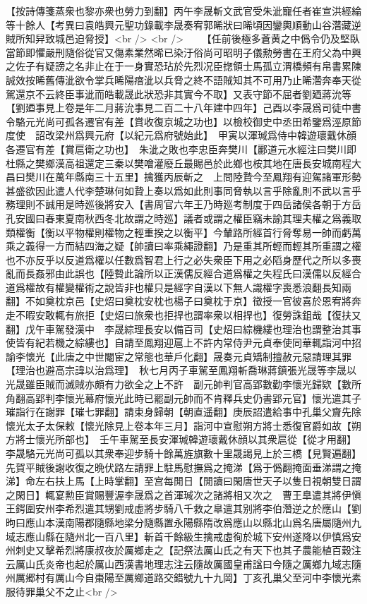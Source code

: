 【按詩傳箋蒸衆也黎亦衆也勞力到翻】丙午李晟斬文武官受朱泚寵任者崔宣洪經綸等十餘人【考異曰袁皓興元聖功錄載李晟奏宥郭晞狀曰晞頃因鑾輿順動山谷濳藏逆賊所知舁致城邑迫脅授】<br />
<br />
　　【任前後極多蒼黄之中僞令仍及堅臥當節即懼嚴刑隨俗從官又傷素業然晞已染汙俗尚可昭明子儀勲勞書在王府父為中興之佐子有疑謗之名非止在于一身實恐玷於先烈况臣揔領士馬孤立渭橋頻有帛書累陳誠效按晞舊傳泚欲令掌兵晞陽瘖泚以兵脅之終不語賊知其不可用乃止晞濳奔奉天從駕還京不云終臣事泚而皓載晟此狀恐非其實今不取】又表守節不屈者劉廼蔣沇等【劉廼事見上卷是年二月蔣沇事見二百二十八年建中四年】己酉以李晟爲司徒中書令駱元光尚可孤各遷官有差【賞收復京城之功也】以檢校御史中丞田希鑒爲涇原節度使　詔改梁州爲興元府【以紀元爲府號始此】　甲寅以渾瑊爲侍中韓遊瓌戴休顔各遷官有差【賞扈衛之功也】　朱泚之敗也李忠臣奔樊川【酈道元水經注曰樊川即杜縣之樊鄉漢高祖還定三秦以樊噲灌廢丘最賜邑於此鄉也桉其地在唐長安城南程大昌曰樊川在萬年縣南三十五里】擒獲丙辰斬之　上問陸贄今至鳳翔有迎駕諸軍形勢甚盛欲因此遣人代李楚琳何如贄上奏以爲如此則事同脅執以言乎除亂則不武以言乎務理則不誠用是時廵後將安入【書周官六年王乃時廵考制度于四岳諸侯各朝于方岳孔安國曰春東夏南秋西冬北故謂之時廵】議者或謂之權臣竊未諭其理夫權之爲義取類權衡【衡以平物權則權物之輕重揆之以衡平】今輦路所經首行脅奪易一帥而虧萬乘之義得一方而結四海之疑【帥讀曰率乘繩證翻】乃是重其所輕而輕其所重謂之權也不亦反乎以反道爲權以任數爲智君上行之必失衆臣下用之必䧟身歷代之所以多喪亂而長姦邪由此誤也【陸䞇此論所以正漢儒反經合道爲權之失程氏曰漢儒以反經合道爲權故有權變權術之說皆非也權只是經字自漢以下無人識權字喪悉浪翻長知兩翻】不如奠枕京邑【史炤曰奠枕安枕也楊子曰奠枕于京】徵授一官彼喜於恩宥將奔走不暇安敢輒有旅拒【史炤曰旅衆也拒捍也謂率衆以相捍也】復勞誅鉏哉【復扶又翻】戊午車駕發漢中　李晟綜理長安以備百司【史炤曰綜機縷也理治也謂整治其事使皆有紀若機之綜縷也】自請至鳳翔迎扈上不許内常侍尹元貞奉使同華輒詣河中招諭李懷光【此唐之中世閹宦之常態也華戶化翻】晟奏元貞矯制擅赦元惡請理其罪【理治也避高宗諱以治爲理】　秋七月丙子車駕至鳳翔斬喬琳蔣鎮張光晟等李晟以光晟雖臣賊而滅賊亦頗有力欲全之上不許　副元帥判官高郢數勸李懷光歸欵【數所角翻高郢判李懷光幕府懷光此時已罷副元帥而不肯釋兵史仍書郢元官】懷光遣其子璀詣行在謝罪【璀七罪翻】請束身歸朝【朝直遥翻】庚辰詔遣給事中孔巢父齎先除懷光太子太保敕【懷光除見上卷本年三月】詣河中宣慰朔方將士悉復官爵如故【朔方將士懷光所部也】　壬午車駕至長安渾瑊韓遊瓌戴休顔以其衆扈從【從才用翻】李晟駱元光尚可孤以其衆奉迎步騎十餘萬旌旗數十里晟謁見上於三橋【見賢遍翻】先賀平賊後謝收復之晩伏路左請罪上駐馬慰撫爲之掩涕【爲于僞翻掩面垂涕謂之掩涕】命左右扶上馬【上時掌翻】至宫每閒日【閒讀曰閑唐世天子以隻日視朝雙日謂之閑日】輒宴勲臣賞賜豐渥李晟爲之首渾瑊次之諸將相又次之　曹王臯遣其將伊愼王鍔圍安州李希烈遣其甥劉戒虛將步騎八千救之臯遣其别將李伯濳逆之於應山【劉昫曰應山本漢南陽郡隨縣地梁分隨縣置永陽縣隋改爲應山以縣北山爲名唐屬隨州九域志應山縣在隨州北一百八里】斬首千餘級生擒戒虛徇於城下安州遂降以伊慎爲安州刺史又擊希烈將康叔夜於厲鄉走之【記祭法厲山氏之有天下也其子農能植百穀注云厲山氏炎帝也起於厲山西漢書地理志注云隨故厲國皇甫諡曰今隨之厲鄉九域志隨州厲郷村有厲山今自棗陽至厲鄉道路交錯號九十九岡】丁亥孔巢父至河中李懷光素服待罪巢父不之止<br />
